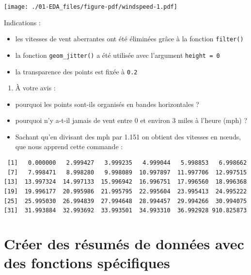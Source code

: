 \documentclass[
  a4paper,
  DIV=11,
  numbers=noendperiod,
  oneside]{scrreprt}
\newenvironment{Shaded}{}{}
\newcommand{\FloatTok}[1]{\textcolor[rgb]{0.00,0.36,0.77}{#1}}
\newcommand{\FunctionTok}[1]{\textcolor[rgb]{0.44,0.26,0.76}{#1}}
\newcommand{\NormalTok}[1]{\textcolor[rgb]{0.14,0.16,0.18}{#1}}
\newcommand{\SpecialCharTok}[1]{\textcolor[rgb]{0.00,0.36,0.77}{#1}}
\providecommand{\tightlist}{%
  \setlength{\itemsep}{0pt}\setlength{\parskip}{0pt}}\usepackage{longtable,booktabs,array}
\begin{document}
\texttt{[image: ./01-EDA\_files/figure-pdf/windspeed-1.pdf]}

Indications :

\begin{itemize}
\tightlist
\item
  les vitesses de vent aberrantes ont été éliminées grâce à la fonction
  \texttt{filter()}
\item
  la fonction \texttt{geom\_jitter()} a été utilisée avec l'argument
  \texttt{height\ =\ 0}
\item
  la transparence des points est fixée à \texttt{0.2}
\end{itemize}

\begin{enumerate}
\def\labelenumi{\arabic{enumi}.}
\setcounter{enumi}{5}
\tightlist
\item
  À votre avis :
\end{enumerate}

\begin{itemize}
\tightlist
\item
  pourquoi les points sont-ils organisés en bandes horizontales ?
\item
  pourquoi n'y a-t-il jamais de vent entre 0 et environ 3 miles à
  l'heure (mph) ?
\item
  Sachant qu'en divisant des mph par 1.151 on obtient des vitesses en
  nœuds, que nous apprend cette commande :
\end{itemize}

\begin{Shaded}
\end{Shaded}

\begin{verbatim}
 [1]   0.000000   2.999427   3.999235   4.999044   5.998853   6.998662
 [7]   7.998471   8.998280   9.998089  10.997897  11.997706  12.997515
[13]  13.997324  14.997133  15.996942  16.996751  17.996560  18.996368
[19]  19.996177  20.995986  21.995795  22.995604  23.995413  24.995222
[25]  25.995030  26.994839  27.994648  28.994457  29.994266  30.994075
[31]  31.993884  32.993692  33.993501  34.993310  36.992928 910.825873
\end{verbatim}

\hypertarget{cruxe9er-des-ruxe9sumuxe9s-de-donnuxe9es-avec-des-fonctions-spuxe9cifiques}{%
\section{Créer des résumés de données avec des fonctions
spécifiques}\label{cruxe9er-des-ruxe9sumuxe9s-de-donnuxe9es-avec-des-fonctions-spuxe9cifiques}}
\end{document}
